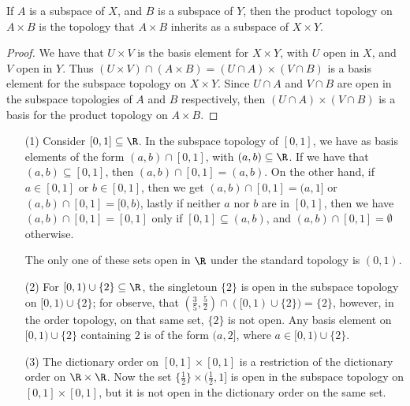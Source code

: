 \begin{theorem}\label{1.5.4}
    If $A$ is a subspace of  $X$, and  $B$ is a subspace of  $Y$, then the product topology on
     $A \times B$ is the topology that  $A \times B$ inherits as a subspace of  $X \times Y$.
\end{theorem}
\begin{proof}
    We have that $U \times V$ is the basis element for $X \times Y$, with  $U$ open in  $X$, and
    $V$ open in  $Y$. Thus  $(U \times V) \cap (A \times B)=(U \cap A) \times (V \cap B)$ is a basis element
    for the subspace topology on $X \times Y$. Since  $U \cap A$ and  $V \cap B$ are open in the subspace
    topologies of  $A$ and  $B$ respectively, then  $(U  \cap A) \times (V \cap B)$ is a basis for
    the product topology on $A \times B$.
\end{proof}

\begin{example}
    \begin{enumerate}
        \item[(1)] Consider $[0,1] \subseteq \R$. In the subspace topology of  $[0,1]$, we have as
            basis elements of the form $(a,b) \cap [0,1]$, with $(a,b) \subseteq \R$. If we have
            that  $(a,b) \subseteq [0,1]$, then $(a,b) \cap [0,1]=(a,b)$. On the other hand, if $a \in [0,1]$
            or $b \in [0,1]$, then we get $(a,b) \cap [0,1]=(a,1]$ or $(a,b) \cap [0,1]=[0,b)$, lastly if neither
            $a$ nor  $b$ are in $[0,1]$, then we have $(a,b) \cap [0,1]=[0,1]$ only if  $[0,1] \subseteq (a,b)$, and
            $(a,b) \cap [0,1]=\emptyset$ otherwise.

            The only one of these sets open in $\R$ under the standard topology
            is $(0,1)$.

        \item[(2)] For  $[0,1) \cup \{2\} \subseteq \R$, the singletoun  $\{2\}$ is open in the
            subspace topology on $[0,1) \cup \{2\}$; for observe, that $(\frac{3}{5},\frac{5}{2}) \cap
            ([0,1) \cup \{2\})=\{2\}$, however, in the order topology, on that same set, $\{2\}$ is not open.
            Any basis element on  $[0,1) \cup \{2\}$ containing  $2$ is of the form $(a,2]$, where
            $a \in [0,1) \cup \{2\}$.

        \item[(3)] The dictionary order on $[0,1] \times [0,1]$ is a restriction of the dictionary order
            on $\R \times \R$. Now the set  $\{\frac{1}{2}\} \times (\frac{1}{2},1]$ is open in the
            subspace topology on $[0,1] \times [0,1]$, but it is not open in the dictionary order on the
            same set.
    \end{enumerate}
\end{example}

